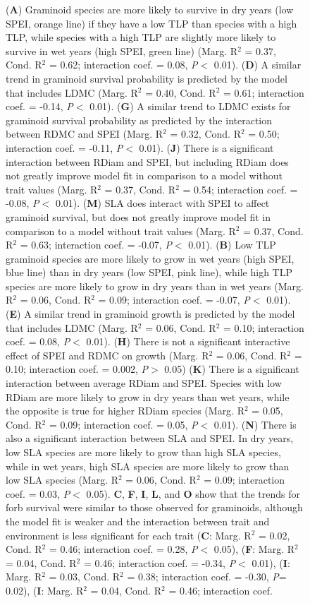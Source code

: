 \documentclass[12pt, letterpaper]{article}
\begin{document}
\begin{figure}
   \ContinuedFloat
   \caption{
(\textbf{A}) Graminoid species are more likely to survive in dry years (low SPEI, orange line) if they have a low TLP than species with a high TLP, while species with a high TLP are slightly more likely to survive in wet years (high SPEI, green line) (Marg. R$^2$ = 0.37, Cond. R$^2$ = 0.62; interaction coef. = 0.08, \textit{P}$<$ 0.01). (\textbf{D}) A similar trend in graminoid survival probability is predicted by the model that includes LDMC (Marg. R$^2$ = 0.40, Cond. R$^2$ = 0.61; interaction coef. = -0.14, \textit{P}$<$ 0.01). (\textbf{G}) A similar trend to LDMC exists for graminoid survival probability as predicted by the interaction between RDMC and SPEI (Marg. R$^2$ = 0.32, Cond. R$^2$ = 0.50; interaction coef. = -0.11, \textit{P}$<$ 0.01). (\textbf{J}) There is a significant interaction between RDiam and SPEI, but including RDiam does not greatly improve model fit in comparison to a model without trait values (Marg. R$^2$ = 0.37, Cond. R$^2$ = 0.54; interaction coef. = -0.08, \textit{P}$<$ 0.01). (\textbf{M}) SLA does interact with SPEI to affect graminoid survival, but does not greatly improve model fit in comparison to a model without trait values (Marg. R$^2$ = 0.37, Cond. R$^2$ = 0.63; interaction coef. = -0.07, \textit{P}$<$ 0.01). (\textbf{B}) Low TLP graminoid species are more likely to grow in wet years (high SPEI, blue line) than in dry years (low SPEI, pink line), while high TLP species are more likely to grow in dry years than in wet years (Marg. R$^2$ = 0.06, Cond. R$^2$ = 0.09; interaction coef. = -0.07, \textit{P}$<$ 0.01). (\textbf{E}) A similar trend in graminoid growth is predicted by the model that includes LDMC (Marg. R$^2$ = 0.06, Cond. R$^2$ = 0.10; interaction coef. = 0.08, \textit{P}$<$ 0.01). (\textbf{H}) There is not a significant interactive effect of SPEI and RDMC on growth (Marg. R$^2$ = 0.06, Cond. R$^2$ = 0.10; interaction coef. = 0.002, \textit{P}$>$ 0.05) (\textbf{K}) There is a significant interaction between average RDiam and SPEI. Species with low RDiam are more likely to grow in dry years than wet years, while the opposite is true for higher RDiam species (Marg. R$^2$ = 0.05, Cond. R$^2$ = 0.09; interaction coef. = 0.05, \textit{P}$<$ 0.01). (\textbf{N}) There is also a significant interaction between SLA and SPEI. In dry years, low SLA species are more likely to grow than high SLA species, while in wet years, high SLA species are more likely to grow than low SLA species (Marg. R$^2$ = 0.06, Cond. R$^2$ = 0.09; interaction coef. = 0.03, \textit{P}$<$ 0.05). \textbf{C}, \textbf{F}, \textbf{I}, \textbf{L}, and \textbf{O} show that the trends for forb survival were similar to those observed for graminoids, although the model fit is weaker and the interaction between trait and environment is less significant for each trait (\textbf{C}: Marg. R$^2$ = 0.02, Cond. R$^2$ = 0.46; interaction coef. = 0.28, \textit{P}$<$ 0.05), (\textbf{F}: Marg. R$^2$ = 0.04, Cond. R$^2$ = 0.46; interaction coef. = -0.34, \textit{P}$<$ 0.01), (\textbf{I}: Marg. R$^2$ = 0.03, Cond. R$^2$ = 0.38; interaction coef. = -0.30, \textit{P}= 0.02), (\textbf{I}: Marg. R$^2$ = 0.04, Cond. R$^2$ = 0.46; interaction coef. }
\end{figure}
\end{document}
